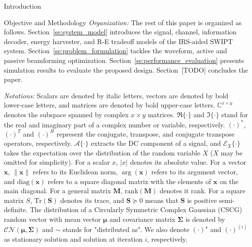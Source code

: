 \documentclass[journal]{IEEEtran}
\begin{document}
\begin{section}{Introduction}
\begin{subsection}{Objective and Methodology}
			\textit{Organization:} The rest of this paper is organized as follows. Section~\ref{se:system_model} introduces the signal, channel, information decoder, energy harvester, and R-E tradeoff models of the IRS-aided SWIPT system. Section~\ref{se:problem_formulation} tackles the waveform, active and passive beamforming optimization. Section~\ref{se:performance_evaluation} presents simulation results to evaluate the proposed design. Section~[TODO] concludes the paper.

			\textit{Notations:} Scalars are denoted by italic letters, vectors are denoted by bold lower-case letters, and matrices are denoted by bold upper-case letters. $\mathbb{C}^{x \times y}$ denotes the subspace spanned by complex $x \times y$ matrices. $\Re\{\cdot\}$ and $\Im\{\cdot\}$ stand for the real and imaginary part of a complex number or variable, respectively. $(\cdot)^*$, $(\cdot)^T$ and $(\cdot)^H$ represent the conjugate, transpose, and conjugate transpose operators, respectively. $\mathcal{A}\{\cdot\}$ extracts the DC component of a signal, and $\mathcal{E}_X\{\cdot\}$ takes the expectation over the distribution of the random variable $X$ ($X$ may be omitted for simplicity). For a scalar $x$, $\lvert{x}\rvert$ denotes its absolute value. For a vector $\boldsymbol{x}$, $\lVert{\boldsymbol{x}}\rVert$ refers to its Euclidean norm, $\arg(\boldsymbol{x})$ refers to its argument vector, and $\mathrm{diag}(\boldsymbol{x})$ refers to a square diagonal matrix with the elements of $\boldsymbol{x}$ on the main diagonal. For a general matrix $\boldsymbol{M}$, $\mathrm{rank}(\boldsymbol{M})$ denotes it rank. For a square matrix $S$, $\mathrm{Tr}(\boldsymbol{S})$ denotes its trace, and $\boldsymbol{S} \succeq 0$ means that $\boldsymbol{S}$ is positive semi-definite. The distribution of a Circularly Symmetric Complex Gaussian (CSCG) random vector with mean vector $\boldsymbol{\mu}$ and covariance matrix $\boldsymbol{\Sigma}$ is denoted by $\mathcal{CN}(\boldsymbol{\mu},\boldsymbol{\Sigma})$ and $\sim$ stands for "distributed as". We also denote $(\cdot)^{\star}$ and $(\cdot)^{(i)}$ as stationary solution and solution at iteration $i$, respectively.
		\end{subsection}
	\end{section}
\end{document}
